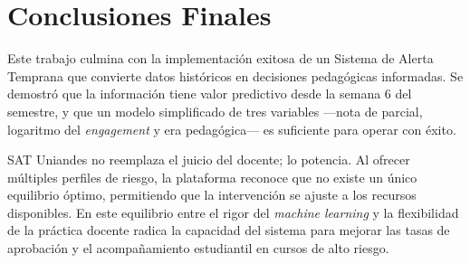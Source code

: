 \documentclass[12pt, letterpaper, openany]{report}
\begin{document}
\section{Conclusiones Finales}

Este trabajo culmina con la implementación exitosa de un Sistema de Alerta Temprana que convierte datos históricos en decisiones pedagógicas informadas. Se demostró que la información tiene valor predictivo desde la semana 6 del semestre, y que un modelo simplificado de tres variables ---nota de parcial, logaritmo del \textit{engagement} y era pedagógica--- es suficiente para operar con éxito.

SAT Uniandes no reemplaza el juicio del docente; lo potencia. Al ofrecer múltiples perfiles de riesgo, la plataforma reconoce que no existe un único equilibrio óptimo, permitiendo que la intervención se ajuste a los recursos disponibles. En este equilibrio entre el rigor del \textit{machine learning} y la flexibilidad de la práctica docente radica la capacidad del sistema para mejorar las tasas de aprobación y el acompañamiento estudiantil en cursos de alto riesgo.

\FloatBarrier

\clearpage
{}
\end{document}
